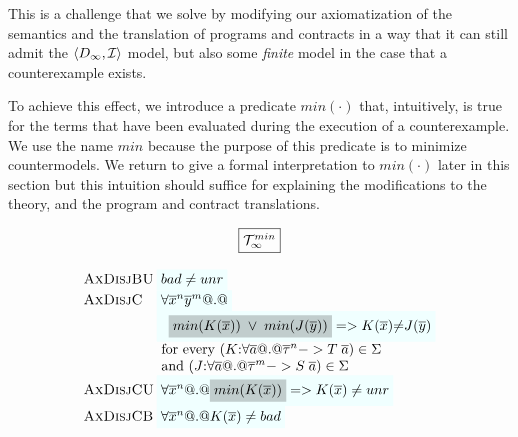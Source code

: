 This is a challenge that we solve by modifying our axiomatization of the semantics 
and the translation of programs and contracts in a way that it can still admit 
the $\langle D_\infty,{\cal I}\rangle$ model, but also some {\em finite} model in 
the case that a counterexample exists. 

To achieve this effect, we introduce a predicate $min(\cdot)$ that, intuitively, is true
for the terms that have been evaluated during the execution of a counterexample. We use the
name $min$ because the purpose of this predicate is to minimize countermodels. 
We return to give a formal interpretation to $min(\cdot)$ later in this section but this 
intuition should suffice for explaining the modifications to the theory, and the program and 
contract translations. 

\begin{figure} 
{\small
\[\setlength{\arraycolsep}{1pt}
\begin{array}{c}
\ruleform{\Th_\infty^{min}} \\ \\ 
\begin{array}{lll}
 \textsc{AxDisjBU} & \formula{\bad \neq \unr} \\ 
 \textsc{AxDisjC} & \formula{\forall \oln{x}{n}\oln{y}{m} @.@} \\ 
                  & \formula{\;\;\highlight{min(K(\ol{x}))\;\lor\;min(J(\ol{y}))} =>
                                  K(\ol{x}){\neq}J(\ol{y})} \\
                  & \text{ for every } (K{:}\forall\as @.@ \oln{\tau}{n} -> T\;\as) \in \Sigma \\ 
                  & \text{ and } (J{:}\forall\as @.@ \oln{\tau}{m} -> S\;\as) \in \Sigma \\
 \textsc{AxDisjCU} & \formula{\forall \oln{x}{n} @.@ \highlight{min(K(\ol{x}))} => K(\ol{x}) \neq unr} \\
 \textsc{AxDisjCB} & \formula{\forall \oln{x}{n} @.@ K(\ol{x}) \neq \bad} \\ 


\end{array}
\end{array}\]}
\end{figure}
